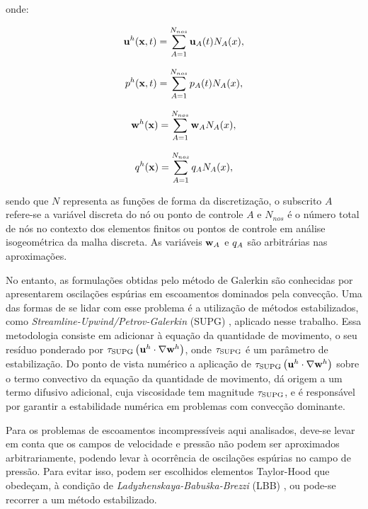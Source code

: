 \documentclass[tese_patricia]{subfiles}%
\begin{document}
\noindent onde:

\begin{align}
\mathbf{u}^{h}(\mathbf{x},t) = \sum_{A = 1}^{N_{nos}} \mathbf{u}_{A}(t)N_{A}(x), \label{eq:dis_vel}
\end{align}

\begin{align}
p^{h}(\mathbf{x},t)  = \sum_{A = 1}^{N_{nos}} p_{A}(t)N_{A}(x),
\end{align}

\begin{align}
\mathbf{w}^{h}(\mathbf{x})  = \sum_{A = 1}^{N_{nos}} \mathbf{w}_{A}N_{A}(x), \label{eq:utest}
\end{align}

\begin{align}
q^{h}(\mathbf{x})  = \sum_{A = 1}^{N_{nos}} q_{A}N_{A}(x), \label{eq:ptest} 
\end{align}

\noindent sendo que $N$ representa as funções de forma da discretização, o subscrito $A$ refere-se a variável discreta do nó ou ponto de controle $A$ e $N_{nos}$ é o número total de nós no contexto dos elementos finitos ou pontos de controle em análise isogeométrica da malha discreta. As variáveis $\mathbf{w}_{A}$ e $q_{A}$ são arbitrárias nas aproximações.

No entanto, as formulações obtidas pelo método de Galerkin são conhecidas por apresentarem oscilações espúrias em escoamentos dominados pela convecção. Uma das formas de se lidar com esse problema é a utilização de métodos estabilizados, como \textit{Streamline-Upwind/Petrov-Galerkin} (SUPG) \cite{BrooksH:1982, HughesT:1984}, aplicado nesse trabalho. Essa metodologia consiste em adicionar à equação da quantidade de movimento, o seu resíduo ponderado por $\tau_{\mathrm{SUPG}} \left(\mathbf{u}^h \cdot \nabla\mathbf{w}^h\right)$, onde $\tau_{\mathrm{SUPG}}$ é um parâmetro de estabilização. Do ponto de vista numérico a aplicação de $\tau_{\mathrm{SUPG}} \left(\mathbf{u}^h \cdot \nabla\mathbf{w}^h\right)$ sobre o termo convectivo da equação da quantidade de movimento, dá origem a um termo difusivo adicional, cuja viscosidade tem magnitude $\tau_{\mathrm{SUPG}}$, e é responsável por garantir a estabilidade numérica em problemas com convecção dominante.

Para os problemas de escoamentos incompressíveis aqui analisados, deve-se levar em conta que os campos de velocidade e pressão não podem ser aproximados arbitrariamente, podendo levar à ocorrência de oscilações espúrias no campo de pressão. Para evitar isso, podem ser escolhidos elementos Taylor-Hood que obedeçam, à condição de \textit{Ladyzhenskaya-Babuška-Brezzi} (LBB) \cite{BrezziF:1991,ZienkiewiczTN:2005,StrangF:2008}, ou pode-se recorrer a um método estabilizado. 
\end{document}

